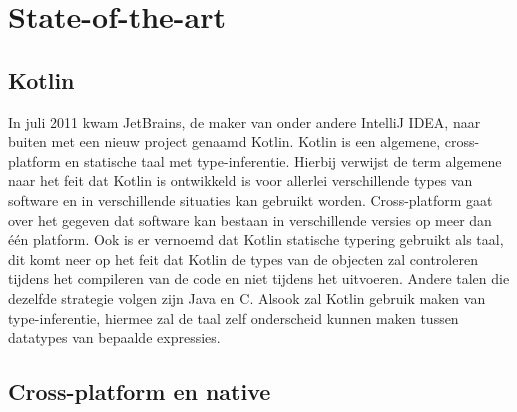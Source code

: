 
\section{State-of-the-art}
\label{sec:state-of-the-art}


\subsection{Kotlin}
\label{sec:kotlin}
In juli 2011 kwam JetBrains, de maker van onder andere IntelliJ IDEA, naar buiten met een nieuw project genaamd Kotlin.\autocite{Jemerov2011} Kotlin is een algemene, cross-platform en statische taal met type-inferentie. \autocite{Oliveira2020} Hierbij verwijst de term algemene naar het feit dat Kotlin is ontwikkeld is voor allerlei verschillende types van software en in verschillende situaties kan gebruikt worden. Cross-platform gaat over het gegeven dat software kan bestaan in verschillende versies op meer dan één platform. Ook is er vernoemd dat Kotlin statische typering gebruikt als taal, dit komt neer op het feit dat Kotlin de types van de objecten zal controleren tijdens het compileren van de code en niet tijdens het uitvoeren. Andere talen die dezelfde strategie volgen zijn Java en C. Alsook zal Kotlin gebruik maken van type-inferentie, hiermee zal de taal zelf onderscheid kunnen maken tussen datatypes van bepaalde expressies. 

\subsection{Cross-platform en native}
\label{sec:cross-platform_en_native}

